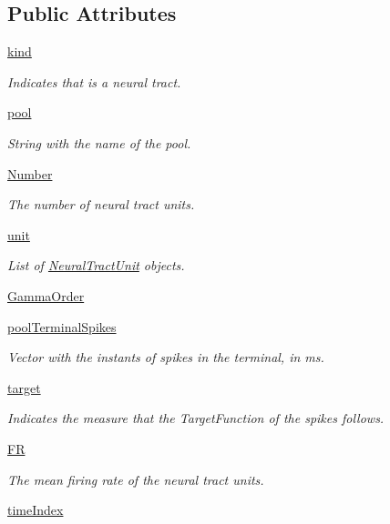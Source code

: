 \subsection*{Public Attributes}
\begin{DoxyCompactItemize}
\item 
\hyperlink{class_synaptic_noise_1_1_synaptic_noise_a06c7bc38c4b3794340171dfa91edf5d8}{kind}
\begin{DoxyCompactList}\small\item\em Indicates that is a neural tract. \end{DoxyCompactList}\item 
\hyperlink{class_synaptic_noise_1_1_synaptic_noise_a7b3350e537e1fcadbf486e851f7f3077}{pool}
\begin{DoxyCompactList}\small\item\em String with the name of the pool. \end{DoxyCompactList}\item 
\hyperlink{class_synaptic_noise_1_1_synaptic_noise_a9f419a5de8bbf318fac8c6c57c58bc77}{Number}
\begin{DoxyCompactList}\small\item\em The number of neural tract units. \end{DoxyCompactList}\item 
\hyperlink{class_synaptic_noise_1_1_synaptic_noise_ac29255d1f6d1d7e1a86fb18de3c3ab4b}{unit}
\begin{DoxyCompactList}\small\item\em List of \hyperlink{namespace_neural_tract_unit}{Neural\+Tract\+Unit} objects. \end{DoxyCompactList}\item 
\hyperlink{class_synaptic_noise_1_1_synaptic_noise_ade79c5746b21fe7702e5f29a7f7b2894}{Gamma\+Order}
\item 
\hyperlink{class_synaptic_noise_1_1_synaptic_noise_a4c2f941b15dc789e984620e8aa6ca5c3}{pool\+Terminal\+Spikes}
\begin{DoxyCompactList}\small\item\em Vector with the instants of spikes in the terminal, in ms. \end{DoxyCompactList}\item 
\hyperlink{class_synaptic_noise_1_1_synaptic_noise_a682fd860345b62be1d93bedb0a02c436}{target}
\begin{DoxyCompactList}\small\item\em Indicates the measure that the Target\+Function of the spikes follows. \end{DoxyCompactList}\item 
\hyperlink{class_synaptic_noise_1_1_synaptic_noise_af74066a527ea667c2e6cdd771391b29c}{FR}
\begin{DoxyCompactList}\small\item\em The mean firing rate of the neural tract units. \end{DoxyCompactList}\item 
\hyperlink{class_synaptic_noise_1_1_synaptic_noise_a064f195dbf5eadb3bbe43e6a6d8d6cec}{time\+Index}
\end{DoxyCompactItemize}


